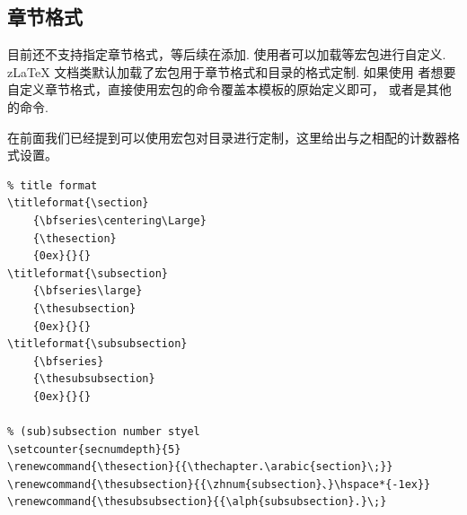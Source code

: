 \subsection{章节格式}\label{conter-settings}
目前还不支持指定章节格式，等后续在添加. 使用者可以加载等宏包进行自定义. z\LaTeX{}
文档类默认加载了宏包用于章节格式和目录的格式定制. 如果使用
者想要自定义章节格式，直接使用宏包的\cmd{\titleformat}命令覆盖本模板的原始定义即可，
或者是其他的命令. 

在前面我们已经提到可以使用宏包对目录进行定制，这里给出与之相配的计数器格式设置。
\begin{verbatim}
% title format
\titleformat{\section}
    {\bfseries\centering\Large}
    {\thesection}
    {0ex}{}{}
\titleformat{\subsection}
    {\bfseries\large}
    {\thesubsection}
    {0ex}{}{}
\titleformat{\subsubsection}
    {\bfseries}
    {\thesubsubsection}
    {0ex}{}{}

% (sub)subsection number styel
\setcounter{secnumdepth}{5}
\renewcommand{\thesection}{{\thechapter.\arabic{section}\;}}
\renewcommand{\thesubsection}{{\zhnum{subsection}、}\hspace*{-1ex}}
\renewcommand{\thesubsubsection}{{\alph{subsubsection}.}\;}
\end{verbatim}

